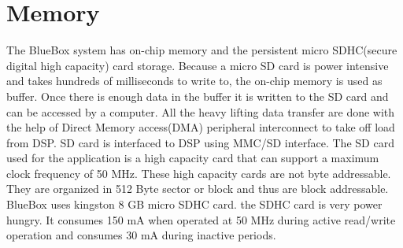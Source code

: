 \section{Memory}\label{memory}
The BlueBox system has on-chip memory and the persistent micro SDHC(secure digital high capacity) card storage. Because a micro SD card is power intensive and takes hundreds of milliseconds to write to, the on-chip memory is used as buffer. Once there is enough data in the buffer it is written to the SD card and can be accessed by a computer. All the heavy lifting data transfer are done with the help of Direct Memory access(DMA) peripheral interconnect to take off load from DSP. SD card is interfaced to DSP using MMC/SD interface. The SD card used for the application is a high capacity card that can support a maximum clock frequency of 50 MHz. These high capacity cards are not byte addressable. They are organized in 512 Byte sector or block and thus are block addressable. BlueBox uses kingston 8 GB micro SDHC card. the SDHC card is very power hungry. It consumes 150 mA  when operated at 50 MHz  during active read/write operation and consumes 30 mA during inactive periods.

